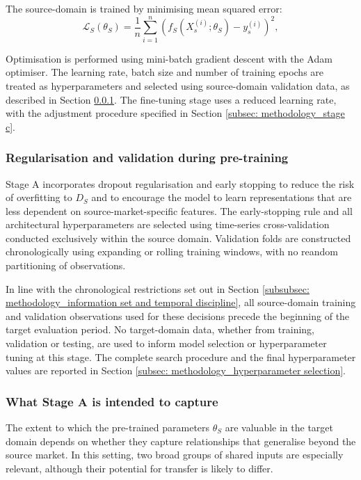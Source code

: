 The source-domain is trained by minimising mean squared error:
\begin{equation}
\mathcal{L}_S\left(\theta_S\right)=\frac{1}{n} \sum_{i=1}^n\left(f_S\left(X_s^{(i)} ; \theta_S\right)-y_s^{(i)}\right)^2,
\end{equation}

Optimisation is performed using mini-batch gradient descent with the Adam optimiser. The learning rate, batch size and number of training epochs are treated as hyperparameters and selected using source-domain validation data, as described in Section \ref{subsubsec: methodology_regularisation and validation during pre-training}. The fine-tuning stage uses a reduced learning rate, with the adjustment procedure specified in Section \ref{subsec: methodology_stage c}.

\subsubsection{Regularisation and validation during pre-training} \label{subsubsec: methodology_regularisation and validation during pre-training}
Stage A incorporates dropout regularisation and early stopping to reduce the risk of overfitting to $D_S$ and to encourage the model to learn representations that are less dependent on source-market-specific features. The early-stopping rule and all architectural hyperparameters are selected using time-series cross-validation conducted exclusively within the source domain. Validation folds are constructed chronologically using expanding or rolling training windows, with no reandom partitioning of observations.

In line with the chronological restrictions set out in Section \ref{subsubsec: methodology_information set and temporal discipline}, all source-domain training and validation observations used for these decisions precede the beginning of the target evaluation period. No target-domain data, whether from training, validation or testing, are used to inform model selection or hyperparameter tuning at this stage. The complete search procedure and the final hyperparameter values are reported in Section \ref{subsec: methodology_hyperparameter selection}.

\subsubsection{What Stage A is intended to capture} \label{subsubsec: methodology_stage a_what stage a is intended to capture}
The extent to which the pre-trained parameters $\theta_S$ are valuable in the target domain depends on whether they capture relationships that generalise beyond the source market. In this setting, two broad groups of shared inputs are especially relevant, although their potential for transfer is likely to differ.

